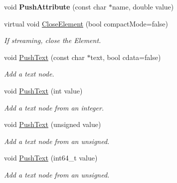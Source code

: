 \begin{DoxyCompactItemize}
void {\bfseries Push\+Attribute} (const char $\ast$name, double value)
\item 
\mbox{\label{classtinyxml2_1_1_x_m_l_printer_af1fb439e5d800999646f333fa2f0699a}} 
virtual void \hyperlink{classtinyxml2_1_1_x_m_l_printer_af1fb439e5d800999646f333fa2f0699a}{Close\+Element} (bool compact\+Mode=false)
\begin{DoxyCompactList}\small\item\em If streaming, close the Element. \end{DoxyCompactList}\item 
\mbox{\label{classtinyxml2_1_1_x_m_l_printer_a1cc16a9362df4332012cb13cff6441b3}} 
void \hyperlink{classtinyxml2_1_1_x_m_l_printer_a1cc16a9362df4332012cb13cff6441b3}{Push\+Text} (const char $\ast$text, bool cdata=false)
\begin{DoxyCompactList}\small\item\em Add a text node. \end{DoxyCompactList}\item 
\mbox{\label{classtinyxml2_1_1_x_m_l_printer_a3e0d4d78de25d4cf081009e1431cea7e}} 
void \hyperlink{classtinyxml2_1_1_x_m_l_printer_a3e0d4d78de25d4cf081009e1431cea7e}{Push\+Text} (int value)
\begin{DoxyCompactList}\small\item\em Add a text node from an integer. \end{DoxyCompactList}\item 
\mbox{\label{classtinyxml2_1_1_x_m_l_printer_a661fb50e7e0a4918d2d259cb0fae647e}} 
void \hyperlink{classtinyxml2_1_1_x_m_l_printer_a661fb50e7e0a4918d2d259cb0fae647e}{Push\+Text} (unsigned value)
\begin{DoxyCompactList}\small\item\em Add a text node from an unsigned. \end{DoxyCompactList}\item 
\mbox{\label{classtinyxml2_1_1_x_m_l_printer_a96b0a0bfe105154a0a6c37d725258f0a}} 
void \hyperlink{classtinyxml2_1_1_x_m_l_printer_a96b0a0bfe105154a0a6c37d725258f0a}{Push\+Text} (int64\+\_\+t value)
\begin{DoxyCompactList}\small\item\em Add a text node from an unsigned. \end{DoxyCompactList}\item 

\end{DoxyCompactItemize}

